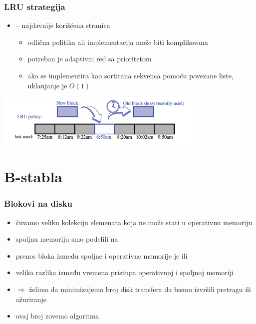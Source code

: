 \documentclass[compress,aspectratio=169]{beamer}
\begin{document}
\begin{frame}[fragile]
  \frametitle{LRU strategija}
  \begin{itemize}
    \item {} -- najdavnije korišćena stranica
    \begin{itemize}
      \item odlična politika ali implementacija može biti komplikovana
      \item potreban je adaptivni red sa prioritetom
      \item ako se implementira kao sortirana sekvenca pomoću povezane
      liste, uklanjanje je $O(1)$
    \end{itemize}
  \end{itemize}
  \begin{center}
    \includegraphics[width=10cm]{asp-15-pic05.png}
  \end{center}
\end{frame}

\section[B-stabla]{B-stabla}

\begin{frame}[fragile]
  \frametitle{Blokovi na disku}
  \begin{itemize}
    \item čuvamo veliku kolekciju elemenata koja ne može stati u 
    operativnu memoriju
    \item spoljnu memoriju smo podelili na 
    \item prenos bloka između spoljne i operativne memorije je 
     ili 
    \item velika razlika između vremena pristupa operativnoj i spoljnoj 
    memoriji
    \item $\Rightarrow$ želimo da minimizujemo broj disk transfera da
    bismo izvršili pretragu ili ažuriranje
    \item ovaj broj zovemo  algoritma
  \end{itemize}
\end{frame}
\end{document}
